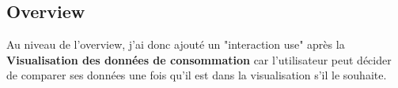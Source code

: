 \subsection{Overview}

\begin{flushleft}
Au niveau de l'overview, j'ai donc ajouté un "interaction use" après la \textbf{Visualisation des données de consommation} car l'utilisateur peut décider de comparer ses données une fois qu'il est dans la visualisation s'il le souhaite.
\end{flushleft}



